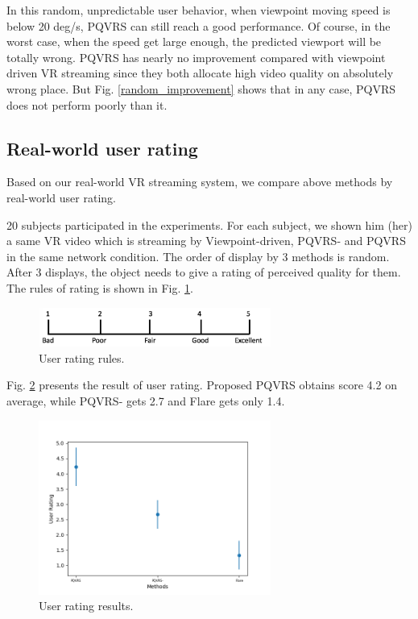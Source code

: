 In this random, unpredictable user behavior, when viewpoint moving speed is below 20 deg/s, PQVRS can still reach a good performance. Of course, in the worst case, when the speed get large enough, the predicted viewport will be totally wrong. PQVRS has nearly no improvement compared with viewpoint driven VR streaming since they both allocate high video quality on absolutely wrong place. But Fig. \ref{random_improvement} shows that in any case, PQVRS does not perform poorly than it.

\subsection{Real-world user rating}

Based on our real-world VR streaming system, we compare above methods by real-world user rating. 

20 subjects participated in the experiments. For each subject, we shown him (her) a same VR video which is streaming by Viewpoint-driven, PQVRS- and PQVRS in the same network condition. The order of display by 3 methods is random. After 3 displays, the object needs to give a rating of perceived quality for them. The rules of rating is shown in Fig. \ref{rating_rules}.

    \begin{figure}
  \centering
  \includegraphics[width=3in]{images/rating.jpg}
  \caption{User rating rules.}
  \label{rating_rules}
  \end{figure}

Fig. \ref{rating_res} presents the result of user rating. Proposed PQVRS obtains score 4.2 on average, while PQVRS- gets 2.7 and Flare gets only 1.4.

    \begin{figure}
  \centering
  \includegraphics[width=3in]{images/rating_result.png}
  \caption{User rating results.}
  \label{rating_res}
  \end{figure}

